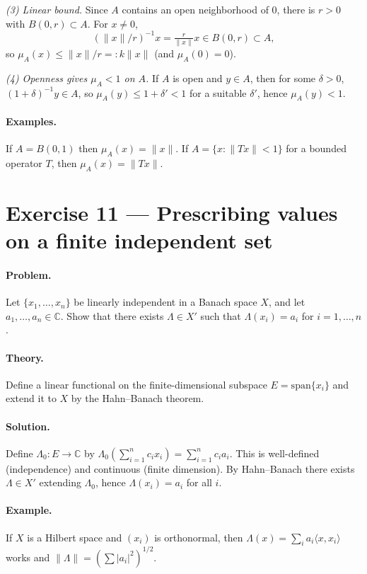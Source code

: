 \documentclass[12pt,a4paper]{article}
\theoremstyle{plain}
\theoremstyle{definition}
\theoremstyle{remark}
\theoremstyle{remark}
\theoremstyle{definition}
\begin{document}
	\noindent
	\emph{(3) Linear bound.}
	Since $A$ contains an open neighborhood of $0$, there is $r>0$ with $B(0,r)\subset A$.
	For $x\neq 0$,
	\[
	(\|x\|/r)^{-1}x = \tfrac{r}{\|x\|}x \in B(0,r)\subset A,
	\]
	so $\mu_A(x)\le \|x\|/r =: k\|x\|$ (and $\mu_A(0)=0$).
	
	\noindent
	\emph{(4) Openness gives $\mu_A<1$ on $A$.}
	If $A$ is open and $y\in A$, then for some $\delta>0$, $(1+\delta)^{-1}y\in A$, so
	$\mu_A(y)\le 1+\delta' <1$ for a suitable $\delta'$, hence $\mu_A(y)<1$.
	
	\paragraph{Examples.}
	If $A=B(0,1)$ then $\mu_A(x)=\|x\|$.
	If $A=\{x:\|Tx\|<1\}$ for a bounded operator $T$, then $\mu_A(x)=\|Tx\|$.
	
	\bigskip
	
	\section*{Exercise 11 — Prescribing values on a finite independent set}
	
	\paragraph{Problem.}
	Let $\{x_1,\dots,x_n\}$ be linearly independent in a Banach space $X$, and let $a_1,\dots,a_n\in\mathbb C$.
	Show that there exists $\Lambda\in X'$ such that $\Lambda(x_i)=a_i$ for $i=1,\dots,n$.
	
	\paragraph{Theory.}
	Define a linear functional on the finite-dimensional subspace $E=\mathrm{span}\{x_i\}$ and extend it to $X$
	by the Hahn--Banach theorem.
	
	\paragraph{Solution.}
	Define $\Lambda_0:E\to\mathbb C$ by $\Lambda_0(\sum_{i=1}^n c_i x_i)=\sum_{i=1}^n c_i a_i$.
	This is well-defined (independence) and continuous (finite dimension).
	By Hahn--Banach there exists $\Lambda\in X'$ extending $\Lambda_0$, hence $\Lambda(x_i)=a_i$ for all $i$.
	
	\paragraph{Example.}
	If $X$ is a Hilbert space and $(x_i)$ is orthonormal, then $\Lambda(x)=\sum_i a_i\langle x,x_i\rangle$ works and
	$\|\Lambda\|=(\sum |a_i|^2)^{1/2}$.
	
\end{document}
